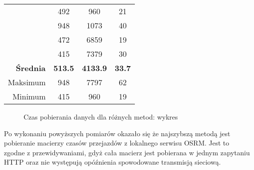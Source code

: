 \begin{table}[t!]
\begin{tabular}{r|ccc}
& 492                  & 960                                                                & 21                                                                 \\
& 948                  & 1073                                                               & 40                                                                 \\
& 472                  & 6859                                                               & 19                                                                 \\
& 415                  & 7379                                                               & 30                                                                 \\ \hline
\textbf{Średnia} & \textbf{513.5}       & \textbf{4133.9}                                                    & \textbf{33.7}                                                      \\ \hline
Maksimum         & 948                  & 7797                                                               & 62                                                                 \\ \hline
Minimum          & 415                  & 960                                                                & 19                                                                

	\end{tabular}
\end{table}
\begin{figure}[b!]
	\caption{Czas pobierania danych dla różnych metod: wykres}
	\begin{bchart}[max=5000, step=1000, unit=ms]
		\label{chart:pobieranie}
		\smallskip
		\smallskip
	\end{bchart}
\end{figure}

\clearpage
Po wykonaniu powyższych pomiarów okazało się że najszybszą metodą jest pobieranie macierzy czasów przejazdów z lokalnego serwisu OSRM. Jest to zgodne z przewidywaniami, gdyż cała macierz jest pobierana w jednym zapytaniu HTTP oraz nie występują opóźnienia spowodowane transmisją sieciową.